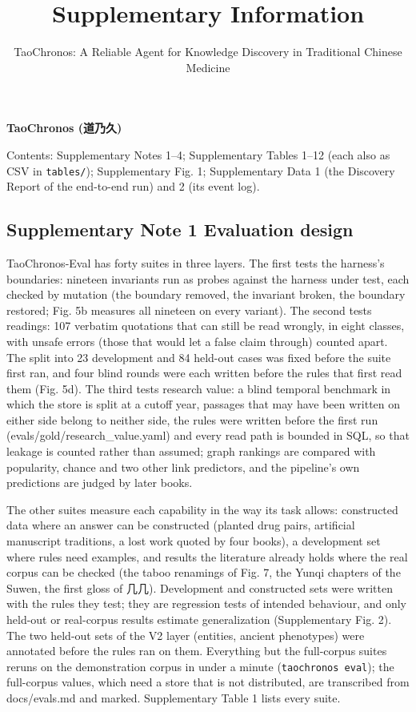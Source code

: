 \documentclass[
]{article}
\title{Supplementary Information}
\subtitle{TaoChronos: A Reliable Agent for Knowledge Discovery in
Traditional Chinese Medicine}
\author{}
\date{}
\begin{document}
\maketitle

\textbf{TaoChronos (道乃久)}

Contents: Supplementary Notes 1--4; Supplementary Tables 1--12 (each
also as CSV in \texttt{tables/}); Supplementary Fig. 1; Supplementary
Data 1 (the Discovery Report of the end-to-end run) and 2 (its event
log).

\hypertarget{supplementary-note-1-evaluation-design}{%
\subsection{Supplementary Note 1 \textbar{} Evaluation
design}\label{supplementary-note-1-evaluation-design}}

TaoChronos-Eval has forty suites in three layers. The first tests the
harness's boundaries: nineteen invariants run as probes against the
harness under test, each checked by mutation (the boundary removed, the
invariant broken, the boundary restored; Fig. 5b measures all nineteen
on every variant). The second tests readings: 107 verbatim quotations
that can still be read wrongly, in eight classes, with unsafe errors
(those that would let a false claim through) counted apart. The split
into 23 development and 84 held-out cases was fixed before the suite
first ran, and four blind rounds were each written before the rules that
first read them (Fig. 5d). The third tests research value: a blind
temporal benchmark in which the store is split at a cutoff year,
passages that may have been written on either side belong to neither
side, the rules were written before the first run
(evals/gold/research\_value.yaml) and every read path is bounded in SQL,
so that leakage is counted rather than assumed; graph rankings are
compared with popularity, chance and two other link predictors, and the
pipeline's own predictions are judged by later books.

The other suites measure each capability in the way its task allows:
constructed data where an answer can be constructed (planted drug pairs,
artificial manuscript traditions, a lost work quoted by four books), a
development set where rules need examples, and results the literature
already holds where the real corpus can be checked (the taboo renamings
of Fig. 7, the Yunqi chapters of the Suwen, the first gloss of 几几).
Development and constructed sets were written with the rules they test;
they are regression tests of intended behaviour, and only held-out or
real-corpus results estimate generalization (Supplementary Fig. 2). The
two held-out sets of the V2 layer (entities, ancient phenotypes) were
annotated before the rules ran on them. Everything but the full-corpus
suites reruns on the demonstration corpus in under a minute
(\texttt{taochronos\ eval}); the full-corpus values, which need a store
that is not distributed, are transcribed from docs/evals.md and marked.
Supplementary Table 1 lists every suite.
\end{document}
